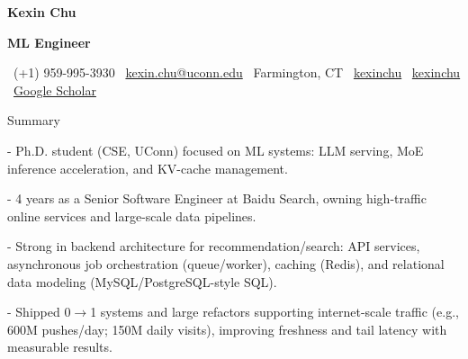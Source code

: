\documentclass[]{resume}
\newcommand{\sectionvspace}{\vspace{1.5pt}}
\newcommand{\MakeHeader}[8]{%
\noindent
{\centering \bfseries \LARGE #1 \par}
\vspace{2pt}

\noindent
\colorbox{HeaderOrange}{%
  \parbox{\textwidth}{%
    \vspace{2pt}
    \centering
    {\color{white}\bfseries\normalsize #2}
    \vspace{2pt}
  }%
}\par

\noindent
\colorbox{HeaderLight}{%
  \parbox{\textwidth}{%
    \vspace{2pt}
    \small
    \faPhone\ #3 \hfill
    \faEnvelope\ \href{mailto:#4}{#4} \hfill
    \faMapMarker*\ #5 \hfill
    \faLinkedin\ \href{#6}{kexinchu} \hfill
    \faGithub\ \href{#7}{kexinchu} \hfill
    \faGraduationCap\ \href{#8}{Google Scholar}
    \vspace{2pt}
  }%
}\par
}
\begin{document}
\MakeHeader
{Kexin Chu}
{ML Engineer}
{(+1) 959-995-3930}
{kexin.chu@uconn.edu}
{Farmington, CT}
{https://www.linkedin.com/in/kexin-chu-69a481192}
{https://kexinchu.github.io/}
{https://scholar.google.com/citations?user=ZIdS3d0AAAAJ}

\begin{rSection}{Summary}\sectionvspace
\item - Ph.D. student (CSE, UConn) focused on ML systems: LLM serving, MoE inference acceleration, and KV-cache management.
\item - 4 years as a Senior Software Engineer at Baidu Search, owning high-traffic online services and large-scale data pipelines.
\item - Strong in backend architecture for recommendation/search: API services, asynchronous job orchestration (queue/worker), caching (Redis), and relational data modeling (MySQL/PostgreSQL-style SQL).
\item - Shipped 0$\rightarrow$1 systems and large refactors supporting internet-scale traffic (e.g., 600M pushes/day; 150M daily visits), improving freshness and tail latency with measurable results.
\end{rSection}
\end{document}
